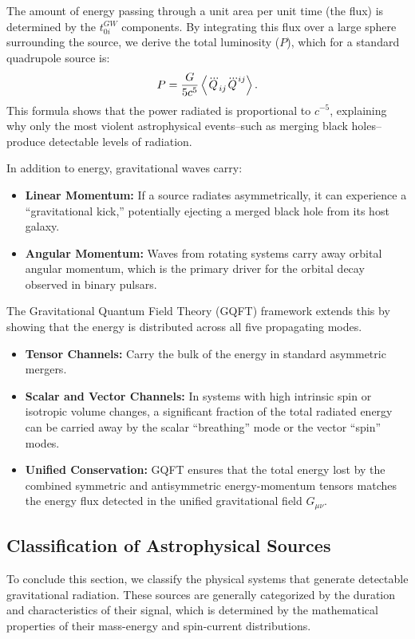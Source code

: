 The amount of energy passing through a unit area per unit time (the flux) is determined by the $t_{0i}^{GW}$ components. By integrating this flux over a large sphere surrounding the source, we derive the total luminosity ($P$), which for a standard quadrupole source is:
\[%
  P = \frac{G}{5c^5} \braket{\dddot{Q}_{ij} \dddot{Q}^{ij}}
.\]%
This formula shows that the power radiated is proportional to $c^{-5}$, explaining why only the most violent astrophysical events--such as merging black holes--produce detectable levels of radiation.

In addition to energy, gravitational waves carry:
\begin{itemize}
  \item \textbf{Linear Momentum:} If a source radiates asymmetrically, it can experience a ``gravitational kick,'' potentially ejecting a merged black hole from its host galaxy.
  \item \textbf{Angular Momentum:} Waves from rotating systems carry away orbital angular momentum, which is the primary driver for the orbital decay observed in binary pulsars.
\end{itemize}

The Gravitational Quantum Field Theory (GQFT) framework extends this by showing that the energy is distributed across all five propagating modes.
\begin{itemize}
  \item \textbf{Tensor Channels:} Carry the bulk of the energy in standard asymmetric mergers.
  \item \textbf{Scalar and Vector Channels:} In systems with high intrinsic spin or isotropic volume changes, a significant fraction of the total radiated energy can be carried away by the scalar ``breathing'' mode or the vector ``spin'' modes.
  \item \textbf{Unified Conservation:} GQFT ensures that the total energy lost by the combined symmetric and antisymmetric energy-momentum tensors matches the energy flux detected in the unified gravitational field $G_{\mu\nu}$.
\end{itemize}

\subsection{Classification of Astrophysical Sources} To conclude this section, we classify the physical systems that generate detectable gravitational radiation. These sources are generally categorized by the duration and characteristics of their signal, which is determined by the mathematical properties of their mass-energy and spin-current distributions.

